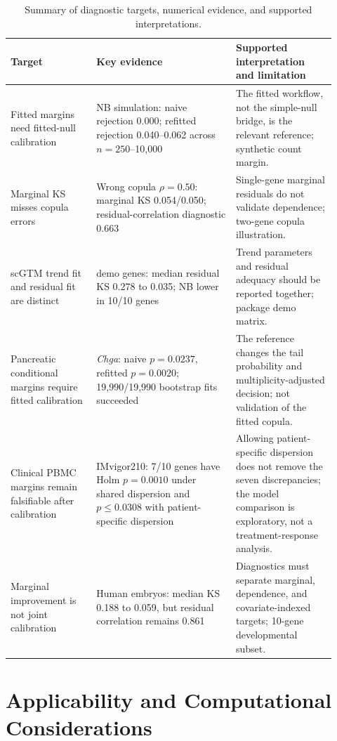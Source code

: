 \documentclass[preprint,12pt]{elsarticle}
\theoremstyle{plain}
\theoremstyle{remark}
\begin{document}
\begin{table}[t]
\centering
\scriptsize
\caption{Summary of diagnostic targets, numerical evidence, and supported
interpretations.}
\label{tab:evidence-summary}
\begin{tabular}{@{}>{\raggedright\arraybackslash}p{0.24\linewidth}>{\raggedright\arraybackslash}p{0.39\linewidth}>{\raggedright\arraybackslash}p{0.29\linewidth}@{}}
\toprule
Target & Key evidence & Supported interpretation and limitation\\
\midrule
Fitted margins need fitted-null calibration &
NB simulation: naive rejection 0.000; refitted rejection 0.040--0.062 across
$n=250$--10,000 &
The fitted workflow, not the simple-null bridge, is the relevant reference;
synthetic count margin.\\
\addlinespace
Marginal KS misses copula errors &
Wrong copula $\rho=0.50$: marginal KS 0.054/0.050; residual-correlation diagnostic 0.663 &
Single-gene marginal residuals do not validate dependence; two-gene copula
illustration.\\
\addlinespace
scGTM trend fit and residual fit are distinct &
10 demo genes: median residual KS 0.278 to 0.035; NB lower in 10/10 genes &
Trend parameters and residual adequacy should be reported together; package
demo matrix.\\
\addlinespace
Pancreatic conditional margins require fitted calibration &
\textit{Chga}: naive $p=0.0237$, refitted $p=0.0020$; 19,990/19,990 bootstrap fits succeeded &
The reference changes the tail probability and multiplicity-adjusted decision;
not validation of the fitted copula.\\
\addlinespace
Clinical PBMC margins remain falsifiable after calibration &
IMvigor210: 7/10 genes have Holm $p=0.0010$ under shared dispersion and
$p\le0.0308$ with patient-specific dispersion &
Allowing patient-specific dispersion does not remove the seven discrepancies;
the model comparison is exploratory, not a treatment-response analysis.\\
\addlinespace
Marginal improvement is not joint calibration &
Human embryos: median KS 0.188 to 0.059, but residual correlation remains 0.861 &
Diagnostics must separate marginal, dependence, and covariate-indexed targets;
10-gene developmental subset.\\
\bottomrule
\end{tabular}
\end{table}

\section{Applicability and Computational Considerations}
\label{sec:applicability}
\end{document}
